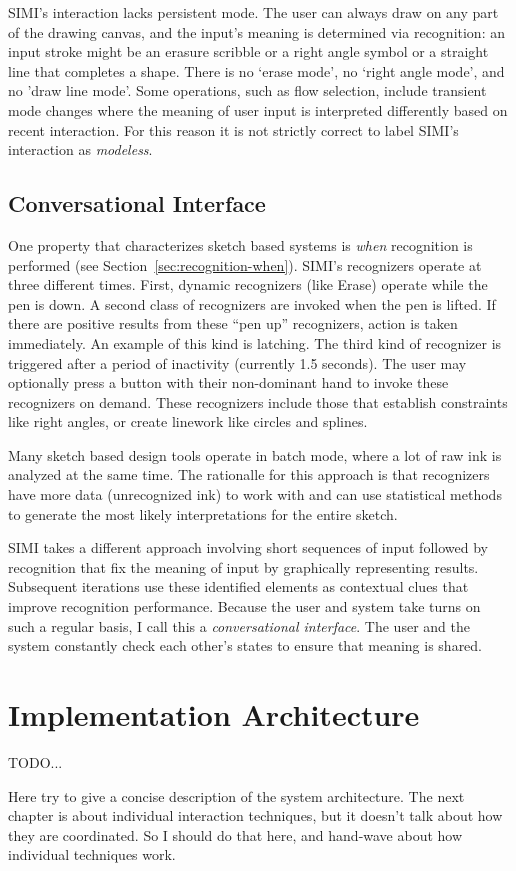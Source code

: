 SIMI's interaction lacks persistent mode. The user can always draw on
any part of the drawing canvas, and the input's meaning is determined
via recognition: an input stroke might be an erasure scribble or a
right angle symbol or a straight line that completes a shape. There is
no `erase mode', no `right angle mode', and no 'draw line mode'. Some
operations, such as flow selection, include transient mode changes
where the meaning of user input is interpreted differently based on
recent interaction. For this reason it is not strictly correct to
label SIMI's interaction as \textit{modeless}.

\subsection{Conversational Interface}

One property that characterizes sketch based systems is \textit{when}
recognition is performed (see
Section~\ref{sec:recognition-when}). SIMI's recognizers operate at
three different times. First, dynamic recognizers (like Erase) operate
while the pen is down. A second class of recognizers are invoked when
the pen is lifted. If there are positive results from these ``pen up''
recognizers, action is taken immediately. An example of this kind is
latching. The third kind of recognizer is triggered after a period of
inactivity (currently 1.5 seconds). The user may optionally press a
button with their non-dominant hand to invoke these recognizers on
demand. These recognizers include those that establish constraints
like right angles, or create linework like circles and splines.

Many sketch based design tools operate in batch mode, where a lot of
raw ink is analyzed at the same time. The rationalle for this approach
is that recognizers have more data (unrecognized ink) to work with and
can use statistical methods to generate the most likely
interpretations for the entire sketch.

SIMI takes a different approach involving short sequences of input
followed by recognition that fix the meaning of input by graphically
representing results. Subsequent iterations use these identified
elements as contextual clues that improve recognition
performance. Because the user and system take turns on such a regular
basis, I call this a \textit{conversational interface}. The user and
the system constantly check each other's states to ensure that meaning
is shared. 

\section{Implementation Architecture}



TODO...

Here try to give a concise description of the system architecture. The
next chapter is about individual interaction techniques, but it
doesn't talk about how they are coordinated. So I should do that here,
and hand-wave about how individual techniques work.
